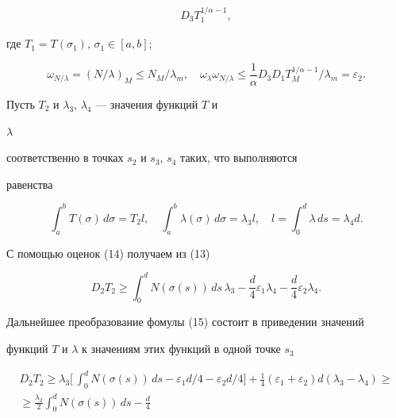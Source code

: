 \begin{pf}
\begin{equation}
\begin{array}{c}
D_3T^{1/\alpha-1}_1, 


\end{array}


\end{equation} 


где $T_1=T(\sigma_1)$, $\sigma_1\in[a,b]$; 


$$ 


\omega_{N/\lambda}=(N/\lambda)_M\le N_M/\lambda_m,\quad 


\omega_\lambda\omega_{N/\lambda}\le\frac{1}{\alpha} 


D_3D_1T^{1/\alpha-1}_M/\lambda_m=\varepsilon_2. 


$$ 


Пусть $T_2$ и $\lambda_3$, $\lambda_4$ --- значения функций $T$ и 


$\lambda$ 


соответственно в точках $s_2$ и $s_3$, $s_4$ таких, что выполняются 


равенства 


$$ 


\int^b_a T(\sigma)\,d\sigma=T_2l,\quad 


\int^b_a\lambda(\sigma)\,d\sigma=\lambda_3l,\quad 


l=\int^d_0\lambda\,ds=\lambda_4d. 


$$ 


С помощью оценок (14) получаем из (13)


\begin{equation} 


D_2T_2\ge \int^d_0 N(\sigma(s))\,ds\,\lambda_3-\frac{d}{4} 


\varepsilon_1\lambda_4-\frac{d}{4}\varepsilon_2\lambda_4. 


\end{equation} 


Дальнейшее преобразование фомулы (15) состоит в приведении значений 


функций $T$ и $\lambda$ к значениям этих функций в одной точке $s_3$


\begin{multline} 


D_2T_2\ge \lambda_3\bigg[\,\int^d_0 N(\sigma(s))\,ds- 


\varepsilon_1d/4-\varepsilon_2d/4\bigg]+\frac{1}{4} 


(\varepsilon_1+\varepsilon_2)d(\lambda_3-\lambda_4)\ge \\ 


\ge \frac{\lambda_3}{2}\int^d_0 N(\sigma(s))\,ds-\frac{d}{4} 



\end{multline}
\end{pf}
